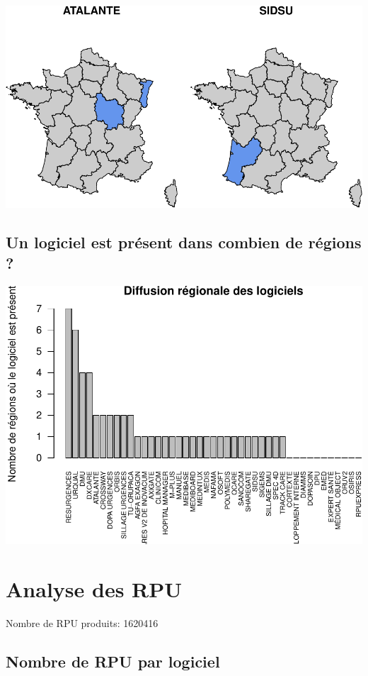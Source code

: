 \documentclass[]{article}
\begin{document}
\includegraphics{septembre2015_files/figure-latex/unnamed-chunk-7-4.pdf}

\subsection{Un logiciel est présent dans combien de régions
?}\label{un-logiciel-est-present-dans-combien-de-regions}

\includegraphics{septembre2015_files/figure-latex/unnamed-chunk-8-1.pdf}

\section{Analyse des RPU}\label{analyse-des-rpu}

Nombre de RPU produits: 1620416

\subsection{Nombre de RPU par
logiciel}\label{nombre-de-rpu-par-logiciel}
\end{document}
